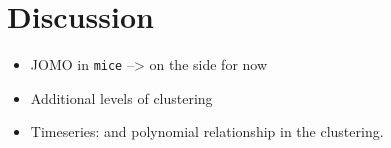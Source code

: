 \documentclass[
]{jss}
\begin{document}
\hypertarget{discussion}{%
\section{Discussion}\label{discussion}}

\begin{itemize}
\item
  JOMO in \texttt{mice} --\textgreater{} on the side for now
\item
  Additional levels of clustering
\item
  Timeseries: and polynomial relationship in the clustering.
\end{itemize}

\renewcommand\refname{References}

\end{document}
